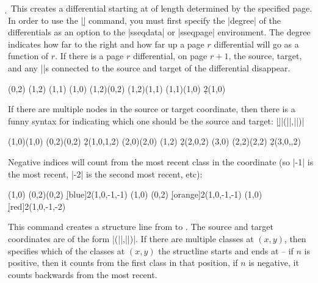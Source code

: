 \documentclass{ltxdoc}
\begin{document}
\begin{sseqdata}[name=ex1,degree={#1}{1-#1}]
\begin{command}{\d{}}
This creates a differential starting at  of length determined by the specified page. In order to use the |\d| command, you must first specify the |degree| of the differentials as an option to the |sseqdata| or |sseqpage| environment. The degree indicates how far to the right and how far up a page $r$ differential will go as a function of $r$. If there is a page $r$ differential, on page $r+1$, the source, target, and any |\structline|s connected to the source and target of the differential disappear.
\begin{codeexample}[width=7.5cm]
\begin{sseqdata}[name=d example,degree={-1}{#1},
                 struct lines=blue]
\class(0,2)
\class(1,2)
\class(1,1)
\class(1,0)
\structline(1,2)(0,2)
\structline(1,2)(1,1)
\structline(1,1)(1,0)
\d2(1,0)
\end{sseqdata}
\printpage[name=d example,page=2]
\hskip0.3cm
\printpage[name=d example,page=3]
\end{codeexample}
If there are multiple nodes in the source or target coordinate, then there is a funny syntax for indicating which one should be the source and target:
|\d||(||,||)|
\begin{codeexample}[width=6cm]
\begin{sseqpage}
\class(1,0)\class(1,0)
\class(0,2)\class(0,2)
\d2(1,0,1,2)
\class(2,0)\class(2,0)
\class(1,2)
\d2(2,0,2)
\class(3,0)
\class(2,2)\class(2,2)
\d2(3,0,,2)
\end{sseqpage}
\end{codeexample}
Negative indices will count from the most recent class in the coordinate (so |-1| is the most recent, |-2| is the second most recent, etc):
\begin{codeexample}[]
\begin{sseqpage}
\class(1,0)
\class(0,2)\class(0,2)
\d[blue]2(1,0,-1,-1)
\class(1,0)
\class(0,2)
\d[orange]2(1,0,-1,-1)
\class(1,0)
\d[red]2(1,0,-1,-2)
\end{sseqpage}
\end{codeexample}

\end{command}

\begin{command}{\structline{}}
This command creates a structure line from  to . The source and target coordinates are of the form |(||,||)|. If there are multiple classes at $(x,y)$, then  specifies which of the classes at $(x,y)$ the structline starts and ends at -- if $n$ is positive, then it counts from the first class in that position, if $n$ is negative, it counts backwards from the most recent.


\end{command}
\end{sseqdata}
\end{document}
